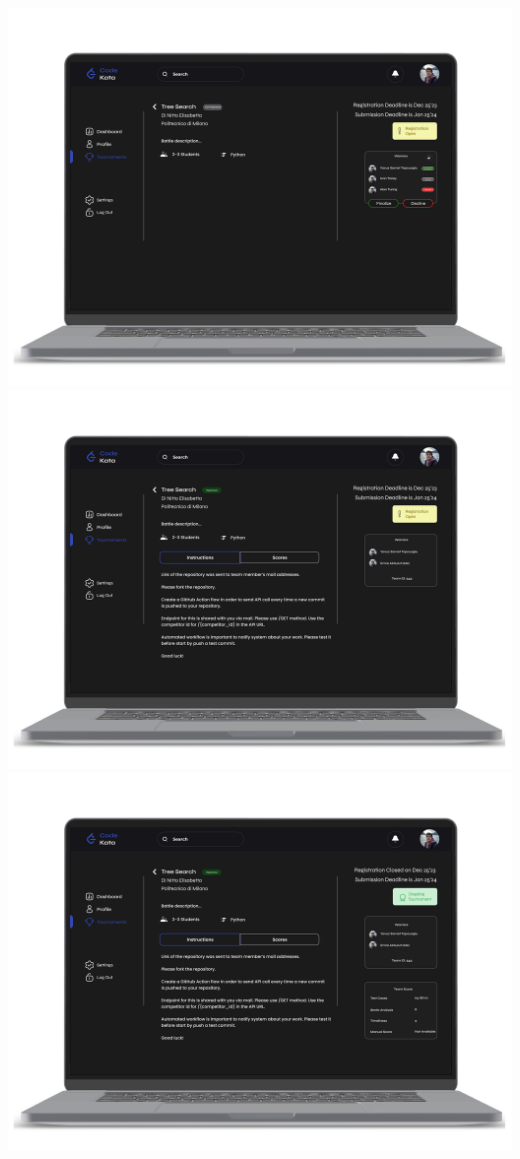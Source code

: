 \newpage
\begin{center}
\includegraphics[scale=0.13]{Images/ui-ux/student_battle/student_battle_1.png}
\includegraphics[scale=0.13]{Images/ui-ux/student_battle/student_battle_2.png}
\includegraphics[scale=0.13]{Images/ui-ux/student_battle/student_battle_3.png}

\end{center}
